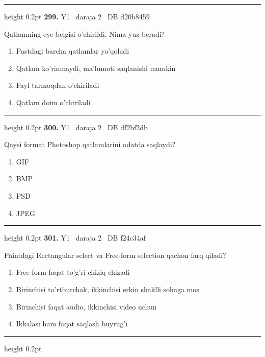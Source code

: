 \documentclass[10pt,a4paper,oneside]{article}
\begin{document}
\vspace{2mm}\hrule height 0.2pt \vspace{4mm}
\hypertarget{q299}{\textbf{\color{ink}299.}}  {\color{muted}\scriptsize Y1 \textbullet\ daraja 2 \textbullet\ DB d20b8459}
\par
Qatlamning eye belgisi o'chirildi. Nima yuz beradi?
\begin{enumerate}[label=\Alph*),leftmargin=9mm]
\item Pastdagi barcha qatlamlar yo'qoladi
\item Qatlam ko'rinmaydi, ma'lumoti saqlanishi mumkin
\item Fayl tarmoqdan o'chiriladi
\item Qatlam doim o'chiriladi
\end{enumerate}
\vspace{2mm}\hrule height 0.2pt \vspace{4mm}
\hypertarget{q300}{\textbf{\color{ink}300.}}  {\color{muted}\scriptsize Y1 \textbullet\ daraja 2 \textbullet\ DB df2bf2db}
\par
Qaysi format Photoshop qatlamlarini odatda saqlaydi?
\begin{enumerate}[label=\Alph*),leftmargin=9mm]
\item GIF
\item BMP
\item PSD
\item JPEG
\end{enumerate}
\vspace{2mm}\hrule height 0.2pt \vspace{4mm}
\hypertarget{q301}{\textbf{\color{ink}301.}}  {\color{muted}\scriptsize Y1 \textbullet\ daraja 2 \textbullet\ DB f24c34af}
\par
Paintdagi Rectangular select va Free-form selection qachon farq qiladi?
\begin{enumerate}[label=\Alph*),leftmargin=9mm]
\item Free-form faqat to'g'ri chiziq chizadi
\item Birinchisi to'rtburchak, ikkinchisi erkin shaklli sohaga mos
\item Birinchisi faqat audio, ikkinchisi video uchun
\item Ikkalasi ham faqat saqlash buyrug'i
\end{enumerate}
\vspace{2mm}\hrule height 0.2pt \vspace{4mm}
\end{document}
